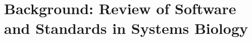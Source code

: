 \newcommand{\bgamma}{\mbox{\boldmath $\Gamma$}}

\newcommand{\bL}{\mbox{\boldmath $L$}}

\newcommand{\bT}{\mbox{\boldmath $T$}}

\newcommand{\bI}{\mbox{\boldmath $I$}}

\newcommand{\bM}{\mbox{\boldmath $M$}}

\newcommand{\bm}{\mbox{\boldmath $m$}}

\newcommand{\bN}{\mbox{\boldmath $N$}}

\newcommand{\bE}{\mbox{\boldmath $E$}}

\newcommand{\bA}{\mbox{\boldmath $A$}}

\newcommand{\bB}{\mbox{\boldmath $B$}}

\newcommand{\bK}{\mbox{\boldmath $K$}}

\newcommand{\bP}{\mbox{\boldmath $P$}}

\newcommand{\bx}{\mbox{\boldmath $x$}}

\newcommand{\bU}{\mbox{\boldmath $U$}}

\newcommand{\bV}{\mbox{\boldmath $V$}}

\newcommand{\bZero}{\mbox{\boldmath $0$}}

\newcommand{\bLo}{\mbox{\boldmath $L_0$}}

\newcommand{\bNo}{\mbox{\boldmath $N_0$}}

\newcommand{\bNr}{\mbox{\boldmath $N_R$}}

\newcommand{\bSi}{\mbox{\boldmath $S_i$}}

\newcommand{\bSd}{\mbox{\boldmath $S_d$}}

\newcommand{\bdSi}{\mbox{\boldmath $dS_i$}}

\newcommand{\bdSd}{\mbox{\boldmath $dS_d$}}

\newcommand{\bS}{\mbox{\boldmath $S$}}

\newcommand{\bdS}{\mbox{\boldmath $dS$}}

\newcommand{\bdt}{\mbox{\boldmath $dt$}}

\newcommand{\bdSdt}{\mbox{$\displaystyle \frac{\bdS}{\bdt}$}}

\newcommand{\bdSddt}{\mbox{$\displaystyle \frac{\bdS_d}{\bdt}$}}

\newcommand{\bdSidt}{\mbox{$\displaystyle \frac{\bdS_i}{\bdt}$}}

\newcommand{\bv}{\mbox{\boldmath $v$}}

\newcommand{\bp}{\mbox{\boldmath $p$}}


\chapter{Background: Review of Software and Standards in Systems Biology}
\label{chap:background}


